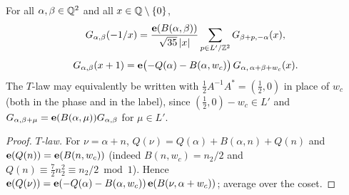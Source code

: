 \begin{theorem}\label{thm:profile}
For all $\alpha,\beta\in\mathbb{Q}^2$ and all $x\in\mathbb{Q}\setminus\{0\}$,
\[
G_{\alpha,\beta}(-1/x)=\frac{\mathbf{e}(B(\alpha,\beta))}{\sqrt{35}\,|x|}\sum_{p\in L'/\mathbb{Z}^2}G_{\beta+p,-\alpha}(x),
\]
\[
G_{\alpha,\beta}(x+1)=\mathbf{e}\bigl(-Q(\alpha)-B(\alpha,w_c)\bigr)\,G_{\alpha,\,\alpha+\beta+w_c}(x).
\]
The $T$-law may equivalently be written with $\tfrac12A^{-1}A^*=(\tfrac12,0)$ in place of $w_c$ (both in the phase and in the label), since
$(\tfrac12,0)-w_c\in L'$ and $G_{\alpha,\beta+\mu}=\mathbf{e}(B(\alpha,\mu))G_{\alpha,\beta}$ for $\mu\in L'$.
\end{theorem}
\begin{proof}
\emph{$T$-law.} For $\nu=\alpha+n$, $Q(\nu)=Q(\alpha)+B(\alpha,n)+Q(n)$ and $\mathbf{e}(Q(n))=\mathbf{e}(B(n,w_c))$ (indeed $B(n,w_c)=n_2/2$ and
$Q(n)\equiv\tfrac72n_2^2\equiv n_2/2\bmod1$). Hence $\mathbf{e}(Q(\nu))=\mathbf{e}(-Q(\alpha)-B(\alpha,w_c))\,\mathbf{e}(B(\nu,\alpha+w_c))$; average over the coset.


\end{proof}
